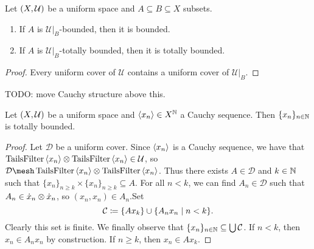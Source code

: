 \begin{lemma} \label{subspaceBoundedness}
Let $\sSet{X, \mathcal{U}}$ be a uniform space and $A\subseteq B\subseteq X$ subsets.
\begin{enumerate}
\item If $A$ is $\mathcal{U}|_B$-bounded, then it is bounded.
\item If $A$ is $\mathcal{U}|_B$-totally bounded, then it is totally bounded.
\end{enumerate}
\end{lemma}
\begin{proof}
Every uniform cover of $\mathcal{U}$ contains a uniform cover of $\mathcal{U}|_B$.
\end{proof}

TODO: move Cauchy structure above this.
\begin{proposition} \label{imageCauchySequenceTotallyBounded}
Let $\sSet{X,\mathcal{U}}$ be a uniform space and $\left\langle x_n \right\rangle\in X^{\mathbb{N}}$ a Cauchy sequence. Then $\{x_n\}_{n\in \mathbb{N}}$ is totally bounded.
\end{proposition}
\begin{proof}
Let $\mathcal{D}$ be a uniform cover. Since $\left\langle x_n \right\rangle$ is a Cauchy sequence, we have that $\operatorname{TailsFilter}\left\langle x_n \right\rangle\otimes \operatorname{TailsFilter}\left\langle x_n \right\rangle \in \mathcal{U}$, so $\mathcal{D}\mesh \TailsFilter\seq{x_n}\otimes \TailsFilter\seq{x_n}$. Thus there exists $A\in \mathcal{D}$ and $k\in \mathbb{N}$ such that $\{x_n\}_{n\geq k}\times \{x_n\}_{n\geq k} \subseteq A$. For all $n< k$, we can find $A_n\in\mathcal{D}$ such that $A_n\in \dot{x}_n\otimes \dot{x}_n$, so $(x_n, x_n)\in A_n$.Set
\[ \mathcal{C} \defeq \{Ax_k\} \cup \setbuilder{A_nx_n}{n < k}. \]
Clearly this set is finite. We finally observe that $\{x_n\}_{n\in\mathbb{N}} \subseteq \bigcup \mathcal{C}$. If $n< k$, then $x_n \in A_nx_n$ by construction. If $n\geq k$, then $x_n \in Ax_k$.
\end{proof}

